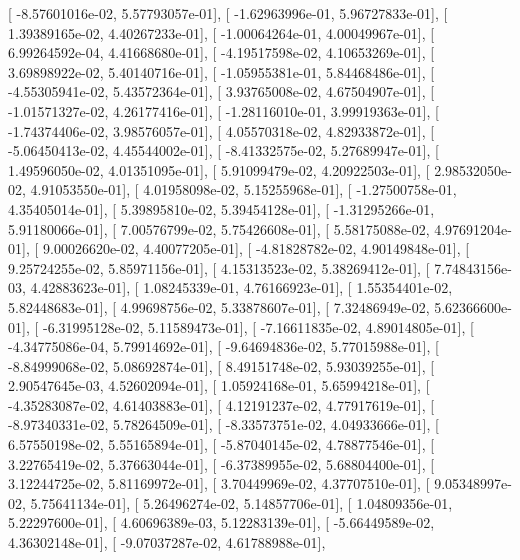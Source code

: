 \documentclass{article}
\begin{document}
       [ -8.57601016e-02,   5.57793057e-01],
       [ -1.62963996e-01,   5.96727833e-01],
       [  1.39389165e-02,   4.40267233e-01],
       [ -1.00064264e-01,   4.00049967e-01],
       [  6.99264592e-04,   4.41668680e-01],
       [ -4.19517598e-02,   4.10653269e-01],
       [  3.69898922e-02,   5.40140716e-01],
       [ -1.05955381e-01,   5.84468486e-01],
       [ -4.55305941e-02,   5.43572364e-01],
       [  3.93765008e-02,   4.67504907e-01],
       [ -1.01571327e-02,   4.26177416e-01],
       [ -1.28116010e-01,   3.99919363e-01],
       [ -1.74374406e-02,   3.98576057e-01],
       [  4.05570318e-02,   4.82933872e-01],
       [ -5.06450413e-02,   4.45544002e-01],
       [ -8.41332575e-02,   5.27689947e-01],
       [  1.49596050e-02,   4.01351095e-01],
       [  5.91099479e-02,   4.20922503e-01],
       [  2.98532050e-02,   4.91053550e-01],
       [  4.01958098e-02,   5.15255968e-01],
       [ -1.27500758e-01,   4.35405014e-01],
       [  5.39895810e-02,   5.39454128e-01],
       [ -1.31295266e-01,   5.91180066e-01],
       [  7.00576799e-02,   5.75426608e-01],
       [  5.58175088e-02,   4.97691204e-01],
       [  9.00026620e-02,   4.40077205e-01],
       [ -4.81828782e-02,   4.90149848e-01],
       [  9.25724255e-02,   5.85971156e-01],
       [  4.15313523e-02,   5.38269412e-01],
       [  7.74843156e-03,   4.42883623e-01],
       [  1.08245339e-01,   4.76166923e-01],
       [  1.55354401e-02,   5.82448683e-01],
       [  4.99698756e-02,   5.33878607e-01],
       [  7.32486949e-02,   5.62366600e-01],
       [ -6.31995128e-02,   5.11589473e-01],
       [ -7.16611835e-02,   4.89014805e-01],
       [ -4.34775086e-04,   5.79914692e-01],
       [ -9.64694836e-02,   5.77015988e-01],
       [ -8.84999068e-02,   5.08692874e-01],
       [  8.49151748e-02,   5.93039255e-01],
       [  2.90547645e-03,   4.52602094e-01],
       [  1.05924168e-01,   5.65994218e-01],
       [ -4.35283087e-02,   4.61403883e-01],
       [  4.12191237e-02,   4.77917619e-01],
       [ -8.97340331e-02,   5.78264509e-01],
       [ -8.33573751e-02,   4.04933666e-01],
       [  6.57550198e-02,   5.55165894e-01],
       [ -5.87040145e-02,   4.78877546e-01],
       [  3.22765419e-02,   5.37663044e-01],
       [ -6.37389955e-02,   5.68804400e-01],
       [  3.12244725e-02,   5.81169972e-01],
       [  3.70449969e-02,   4.37707510e-01],
       [  9.05348997e-02,   5.75641134e-01],
       [  5.26496274e-02,   5.14857706e-01],
       [  1.04809356e-01,   5.22297600e-01],
       [  4.60696389e-03,   5.12283139e-01],
       [ -5.66449589e-02,   4.36302148e-01],
       [ -9.07037287e-02,   4.61788988e-01],
\end{document}
